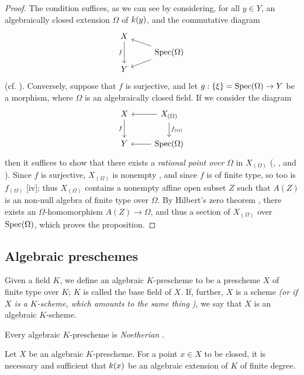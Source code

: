 \begin{proof}
\label{proof-1.6.3.10}
The condition suffices, as we can see by considering, for all $y\in Y$, an algebraically closed extension $\Omega$ of $k(y)$, and the commutative diagram
\[
  \begin{tikzcd}[row sep=tiny]
    X\ar[dd,swap,"f"]\\
    & \Spec(\Omega)\ar[ul]\ar[dl]\\
    Y
  \end{tikzcd}
\]
(cf. ).
Conversely, suppose that $f$ is surjective, and let $g:\{\xi\}={\mathop{\mathrm{Spec}}\nolimits}(\Omega)\to Y$ be a morphism, where $\Omega$ is an algebraically closed field.
If we consider the diagram
\[
  \begin{tikzcd}
    X \ar[d,swap,"f"] &
    X_{(\Omega)}\ar[l]\ar[d,"f_{(\Omega)}"]\\
    Y &
    \Spec(\Omega)\ar[l]
  \end{tikzcd}
\]
then it suffices to show that there exists a \emph{rational point over $\Omega$} in $X_{(\Omega)}$ (, , and ).
Since $f$ is surjective, $X_{(\Omega)}$ is nonempty , and since $f$ is of finite type, so too is $f_{(\Omega)}$ [iv];
thus $X_{(\Omega)}$ contains a nonempty affine open subset $Z$ such that $A(Z)$ is an non-null algebra of finite type over $\Omega$.
By Hilbert's zero theorem \cite{I-21}, there exists an $\Omega$-homomorphism $A(Z)\to\Omega$, and thus a section of $X_{(\Omega)}$ over ${\mathop{\mathrm{Spec}}\nolimits}(\Omega)$, which proves the proposition.
\end{proof}

\subsection{Algebraic preschemes}
\label{subsection-algebraic-preschemes}

\begin{defn}[6.4.1]
\label{1.6.4.1}
Given a field $K$, we define an algebraic $K$-prescheme to be a prescheme $X$ of finite type over $K$;
$K$ is called the base field of $X$.
If, further, $X$ is a scheme \emph{(or if $X$ is a \emph{$K$-scheme}, which amounts to the same thing )}, we say that $X$ is an algebraic $K$-scheme.
\end{defn}

Every algebraic $K$-prescheme is \emph{Noetherian} .

\begin{prop}[6.4.2]
\label{1.6.4.2}
Let $X$ be an algebraic $K$-prescheme.
For a point $x\in X$ to be closed, it is necessary and sufficient that $k(x)$ be an algebraic extension of $K$ of finite degree.
\end{prop}

